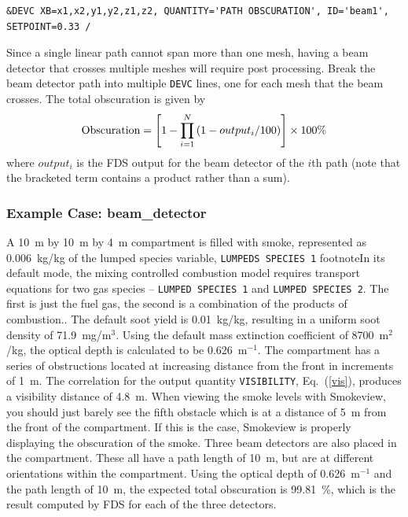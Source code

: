 \documentclass[11pt]{book}
\newcommand{\ct}{\tt\small}
\newcommand{\be}{\begin{equation}}
\newcommand{\ee}{\end{equation}}
\begin{document}
\footnotesize
\begin{verbatim}
&DEVC XB=x1,x2,y1,y2,z1,z2, QUANTITY='PATH OBSCURATION', ID='beam1', SETPOINT=0.33 /
\end{verbatim}
\normalsize

\noindent
Since a single linear path cannot span more than one mesh, having a beam detector that crosses multiple meshes will require post processing.
Break the beam detector path into multiple {\ct DEVC} lines, one for each mesh that the beam crosses.  The total obscuration is given by
\be
  \hbox{Obscuration}  = \left[ 1 -  \prod_{i=1}^N \left( 1-output_i/100 \right)  \right] \times 100  \hbox{\%}
\ee
where $output_i$ is the FDS output for the beam detector of the $i$th path (note that the bracketed term contains a product rather than a sum).

\subsubsection{Example Case: {\bf beam\_detector}}

A 10~m by 10~m by 4~m compartment is filled with smoke, represented as 0.006~kg/kg of
the lumped species variable, {\ct LUMPEDS SPECIES 1} footnote{In its default mode, the mixing controlled combustion
model requires transport equations for two gas species -- {\ct LUMPED SPECIES 1} and {\ct LUMPED SPECIES 2}. The first
is just the fuel gas, the second is a combination of the products of combustion.}. The default soot yield is
0.01~kg/kg, resulting in a uniform soot density of 71.9~mg/m$^3$.
Using the default mass extinction coefficient of
8700~m$^2$/kg, the optical depth is calculated to be 0.626~m$^{-1}$.  The
compartment has a series of obstructions located at increasing distance from the front in increments of
1~m.  The correlation for the output quantity
{\ct VISIBILITY}, Eq.~(\ref{vis}), produces a visibility distance of 4.8~m.
When viewing the smoke levels with Smokeview, you should just barely see
the fifth obstacle which is at a distance of 5~m from the front of the compartment.
If this is the case, Smokeview is properly displaying the obscuration of the
smoke.  Three beam detectors are also
placed in the compartment.  These all have a path length of 10~m,
but are at different orientations within the compartment.
Using the optical depth of 0.626~m$^{-1}$ and the path length of
10~m, the expected total obscuration is 99.81~\%, which is the
result computed by FDS for each of the three detectors.
\end{document}
